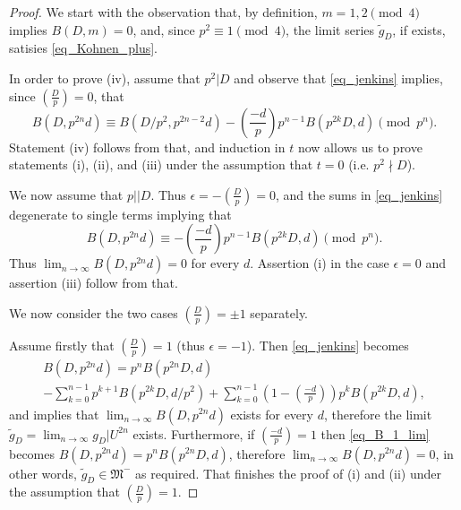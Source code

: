 \documentclass[10pt,a4paper]{amsart}
\newcommand{\gM}{{\mathfrak M}}
\begin{document}
\begin{proof}

We start with the observation that, by definition, $m = 1,2 \pmod{4}$ implies $B(D,m) =0$, and, since $p^2 \equiv 1 \pmod 4$, 
the limit series $\tilde{g}_D$, if exists, satisies \eqref{eq_Kohnen_plus}.

In order to prove (iv), assume that $p^2|D$ and observe that   \eqref{eq_jenkins} implies, since $\left(\frac{D}{p}\right)=0$, that
\[
B(D,p^{2n}d) \equiv B(D/p^2,p^{2n-2}d) - \left( \frac{-d}{p} \right) p^{n-1} B(p^{2k}D,d) \pmod{p^n}.
\]
Statement (iv) follows from that, and induction in $t$ now allows us to prove statements (i), (ii), and (iii) under the assumption that $t=0$ (i.e. $p^2 \nmid D$).

We now assume that $p||D$. Thus $\epsilon =-\left( \frac{D}{p} \right) =0$, and the sums in  \eqref{eq_jenkins}  degenerate to single terms implying that
\[
B(D,p^{2n}d) \equiv - \left( \frac{-d}{p} \right)p^{n-1} B(p^{2k}D,d) \pmod{p^n}.
\]
Thus $\lim_{n \rightarrow \infty} B(D,p^{2n}d) =0$ for every $d$.
Assertion (i) in the case $\epsilon =0$ and assertion (iii) follow from that.

We now consider the two cases $\left(\frac{D}{p} \right) =\pm 1$ separately. 

Assume firstly that $\left(\frac{D}{p} \right) =1$ (thus $\epsilon=-1$). Then \eqref{eq_jenkins} becomes
\begin{multline} \label{eq_B_1_lim}
B(D, p^{2n}d) = p^nB(p^{2n}D,d) \\ - \sum_{k=0}^{n-1} p^{k+1}B(p^{2k}D,d/p^2) + \sum_{k=0}^{n-1} \left(1- \left( \frac{-d}{p} \right) \right) p^k B(p^{2k}D,d),
\end{multline}
and implies that $\lim_{n \rightarrow \infty} B(D,p^{2n}d)$ exists for every $d$, therefore the limit $\tilde{g}_D= \lim_{n \rightarrow \infty} g_D|U^{2n}$ exists.
Furthermore, if $ \left( \frac{-d}{p} \right) = 1$ then \eqref{eq_B_1_lim} becomes $B(D, p^{2n}d) = p^nB(p^{2n}D,d)$, therefore $\lim_{n \rightarrow \infty} B(D, p^{2n}d) =0$,
in other words, $\tilde{g}_D \in \gM^-$ as required. That finishes the proof of (i) and (ii) under the assumption that $\left(\frac{D}{p} \right) =1$.



\end{proof}
\end{document}
